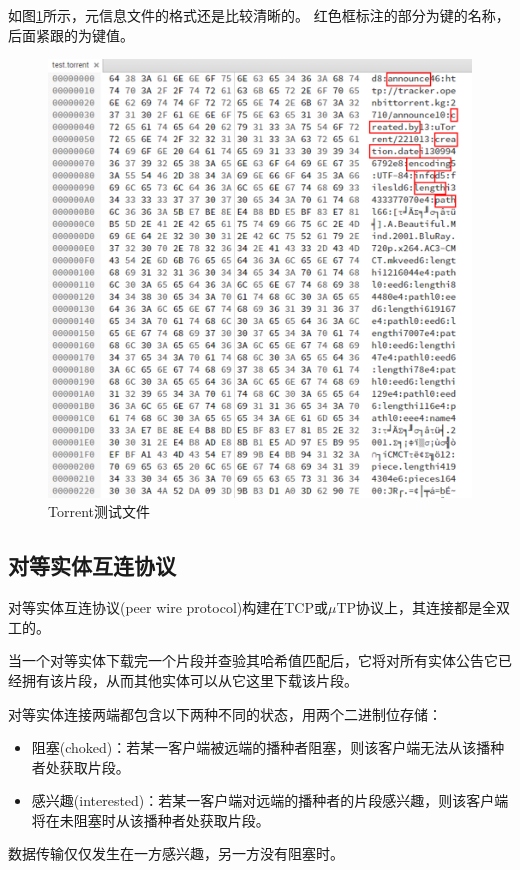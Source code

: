 \documentclass[thesis]{thesis}
\begin{document}
	如图\ref{fig:test_torrent}所示，元信息文件的格式还是比较清晰的。
	红色框标注的部分为键的名称，后面紧跟的为键值。
	\begin{figure}[htbp]
		\centering
		\includegraphics[width=0.6\linewidth]{fig/test_torrent_new.PNG}
		\caption{Torrent测试文件}
		\label{fig:test_torrent}
	\end{figure}
	
	\subsection{对等实体互连协议}
	\label{sub:peer}
	对等实体互连协议(peer wire protocol)构建在TCP或$\mu$TP协议\cite{bt_utp}上，其连接都是全双工的。
	
	当一个对等实体下载完一个片段并查验其哈希值匹配后，它将对所有实体公告它已经拥有该片段，从而其他实体可以从它这里下载该片段。
	
	对等实体连接两端都包含以下两种不同的状态，用两个二进制位存储：
	\begin{itemize}
		\item 阻塞(choked)：若某一客户端被远端的播种者阻塞，则该客户端无法从该播种者处获取片段。
		\item 感兴趣(interested)：若某一客户端对远端的播种者的片段感兴趣，则该客户端将在未阻塞时从该播种者处获取片段。
	\end{itemize}
	数据传输仅仅发生在一方感兴趣，另一方没有阻塞时。
	
\end{document}
